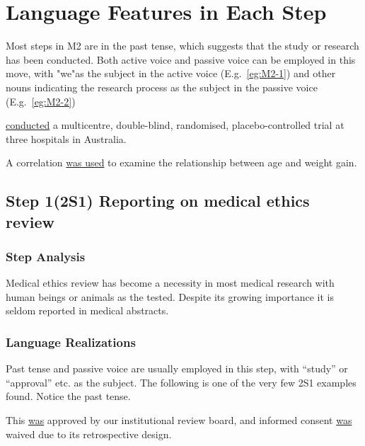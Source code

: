 \documentclass{ctexbook}
\begin{document}
\section{Language Features in Each Step}

Most steps in M2 are in the past tense, which suggests that the study or research has been conducted. Both active voice and passive voice can be employed in this move, with "we"as the subject in the active voice (E.g.~\ref{eg:M2-1}) and other nouns indicating the research process as the subject in the passive voice (E.g.~\ref{eg:M2-2})

\begin{eg}[label={eg:M2-1}]{}
   \uline{conducted} a multicentre, double-blind, randomised, placebo-controlled trial at three hospitals in Australia.
\end{eg}

\begin{eg}[label={eg:M2-2}]{}
  A correlation  \uline{was used} to examine the relationship between age and weight gain.
\end{eg}

  \subsection{Step 1(2S1) Reporting on medical ethics review}

    \subsubsection{Step Analysis}

    Medical ethics review has become a necessity in most medical research with human beings or animals as the tested. Despite its growing importance it is seldom reported in medical abstracts.

    \subsubsection{Language Realizations}

    Past tense and passive voice are usually employed in this step, with ``study'' or ``approval'' etc. as the subject. The following is one of the very few 2S1 examples found. Notice the past tense.
    
    \begin{eg}
      This  \uline{was} approved by our institutional review board, and informed consent \uline{was} waived due to its retrospective design.
    \end{eg}
\end{document}
